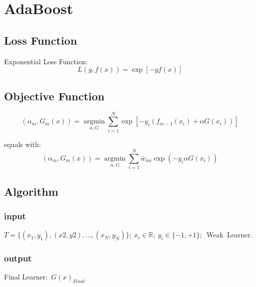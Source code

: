 ﻿\chapter{AdaBoost}

\section{Loss Function}
Exponential Loss Function:
\begin{equation}
L(y,f(x))=\exp[-yf(x)]
\end{equation}

\section{Objective Function}

\begin{equation}
(\alpha_m,G_m(x))= \underset{\alpha,G}{\operatorname{argmin}} \sum_{i=1}^N \exp{[-y_i(f_{m-1}(x_i)+\alpha G(x_i))]}
\end{equation}

equals with:
\begin{equation}
(\alpha_m,G_m(x))= \underset{\alpha,G}{\operatorname{argmin}} \sum_{i=1}^N {\bar{w}}_{mi} \exp{(-y_i \alpha G(x_i))}
\end{equation}

\section{Algorithm}
\subsection{input}
$T=\{(x_1,y_1),(x2,y2),\dotsc,(x_N,y_N) \};\ x_i\in \mathbb{R};\ y_i \in \{-1,+1\};$\ Weak\ Learner.
\subsection{output}
Final Learner:\ $G(x)_{Final}$

